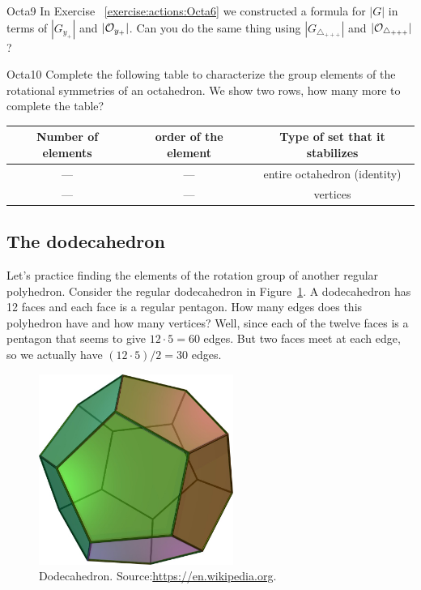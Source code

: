 \begin {exercise}{Octa9}
In Exercise ~\ref {exercise:actions:Octa6} we constructed a formula for $|G|$ in terms of $|G_{y_+}|$ and $|{\cal O}_{y_+}|$.  Can you do the same thing using $|G_{\triangle_{+ + +}}|$ and $|{\cal O}_{\triangle_{+ + +}}|$?
\end{exercise}

\begin{exercise}{Octa10}
Complete the following table to characterize the group elements of the rotational symmetries of an octahedron.  We show two rows, how many more to complete the table? 
 
\begin{tabular}{ |c| c | c |} \hline
  Number of elements & order of the element & Type of set that it stabilizes \\ \hline
  ---&  ---& entire  octahedron (identity) \\ \hline
  --- & ---&  vertices \\

\end{tabular}
\end{exercise}
\subsection{The dodecahedron}
Let's practice finding the elements of the rotation group of another regular polyhedron.  Consider the regular dodecahedron in Figure~\ref{fig:Dodeca}.  A dodecahedron has 12 faces and each face is a regular pentagon.  How many edges does this polyhedron have and how many vertices?  Well, since each of the twelve faces is a pentagon that seems to give $12\cdot 5=60$ edges.  But two faces meet at each edge, so we actually have $(12\cdot 5)/2=30$ edges.

\begin{figure}[ht]
\begin{center}
\includegraphics[width=2.5in]{images/Dodecahedron.png}
\caption{Dodecahedron. Source:\url{https://en.wikipedia.org}.}
\label{fig:Dodeca}
\end{center}
\end{figure}

